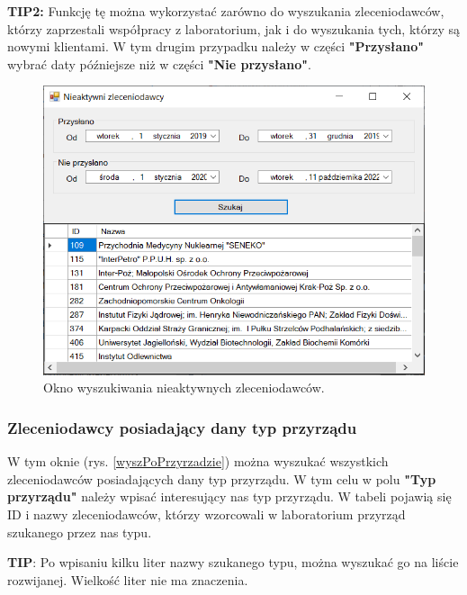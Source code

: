 \textbf{TIP2:} Funkcję tę można wykorzystać zarówno do wyszukania zleceniodawców, którzy zaprzestali współpracy z laboratorium, jak i do wyszukania tych, którzy są nowymi klientami. W tym drugim przypadku należy w części \textbf{"Przysłano"} wybrać daty późniejsze niż w części \textbf{"Nie przysłano"}.

\begin{figure}[htb]
	\centering
	\includegraphics{obrazki/Wyszukiwanie/Zleceniodawcy/nieaktywni_zleceniodawcy.png}
	\caption{Okno wyszukiwania nieaktywnych zleceniodawców.}
	\label{nieaktywniZleceniodawcy}
\end{figure}

\subsubsection{Zleceniodawcy posiadający dany typ przyrządu}
\label{wysz_po_przyrzadzie}

W tym oknie (rys. \ref{wyszPoPrzyrzadzie}) można wyszukać wszystkich zleceniodawców posiadających dany typ przyrządu. W tym celu w polu \textbf{"Typ przyrządu"} należy wpisać interesujący nas typ przyrządu. W tabeli pojawią się ID i nazwy zleceniodawców, którzy wzorcowali w laboratorium przyrząd szukanego przez nas typu. 

\textbf{TIP}: Po wpisaniu kilku liter nazwy szukanego typu, można wyszukać go na liście rozwijanej. Wielkość liter nie ma znaczenia.

